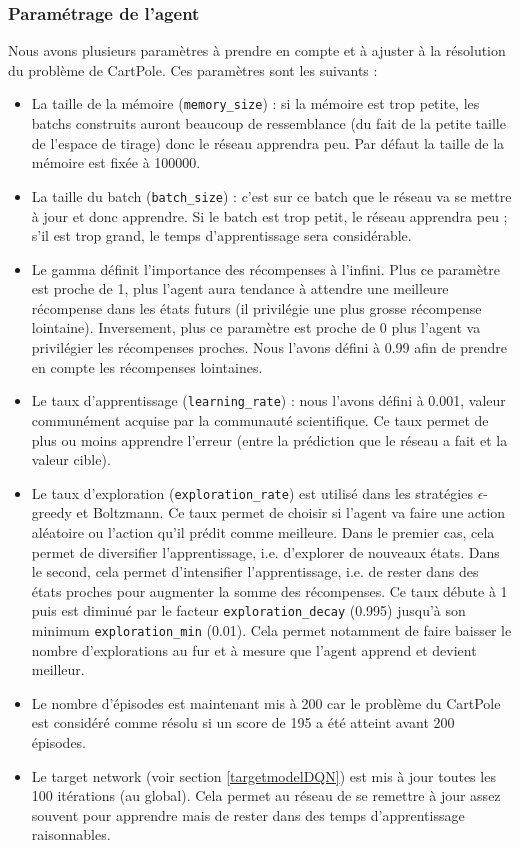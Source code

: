 \documentclass[10pt,a4paper]{article}
\begin{document}
\subsubsection{Paramétrage de l'agent} \label{paramDQN}
Nous avons plusieurs paramètres à prendre en compte et à ajuster à la résolution du problème de CartPole. Ces paramètres sont les suivants : 
\begin{itemize}
	\item La taille de la mémoire (\lstinline{memory_size}) : si la mémoire est trop petite, les batchs construits auront beaucoup de ressemblance (du fait de la petite taille de l'espace de tirage) donc le réseau apprendra peu. Par défaut la taille de la mémoire est fixée à 100000.
    \item La taille du batch (\lstinline{batch_size}) : c'est sur ce batch que le réseau va se mettre à jour et donc apprendre. Si le batch est trop petit, le réseau apprendra peu ; s'il est trop grand, le temps d'apprentissage sera considérable.
    \item Le gamma définit l'importance des récompenses à l'infini. Plus ce paramètre est proche de 1, plus l'agent aura tendance à attendre une meilleure récompense dans les états futurs (il privilégie une plus grosse récompense lointaine). Inversement, plus ce paramètre est proche de 0 plus l'agent va privilégier les récompenses proches. Nous l'avons défini à 0.99 afin de prendre en compte les récompenses lointaines.
    \item Le taux d'apprentissage (\lstinline{learning_rate}) : nous l'avons défini à 0.001, valeur communément acquise par la communauté scientifique. Ce taux permet de plus ou moins apprendre l'erreur (entre la prédiction que le réseau a fait et la valeur cible).
    \item Le taux d'exploration (\lstinline{exploration_rate}) est utilisé dans les stratégies $\epsilon$-greedy et Boltzmann. Ce taux permet de choisir si l'agent va faire une action aléatoire ou l'action qu'il prédit comme meilleure. Dans le premier cas, cela permet de diversifier l'apprentissage, i.e. d'explorer de nouveaux états. Dans le second, cela permet d'intensifier l'apprentissage, i.e. de rester dans des états proches pour augmenter la somme des récompenses. Ce taux débute à 1 puis est diminué par le facteur \lstinline{exploration_decay} (0.995) jusqu'à son minimum \lstinline{exploration_min} (0.01). Cela permet notamment de faire baisser le nombre d'explorations au fur et à mesure que l'agent apprend et devient meilleur.
    \item Le nombre d'épisodes est maintenant mis à 200 car le problème du CartPole est considéré comme résolu si un score de 195 a été atteint avant 200 épisodes.
    \item Le target network (voir section \ref{targetmodelDQN}) est mis à jour toutes les 100 itérations (au global). Cela permet au réseau de se remettre à jour assez souvent pour apprendre mais de rester dans des temps d'apprentissage raisonnables.
\end{itemize}
\end{document}
